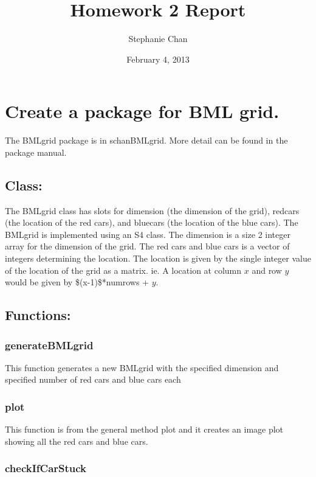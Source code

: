 \documentclass[11pt]{article}
\title{Homework 2 Report}
\author{Stephanie Chan}
\date{February 4, 2013}
\begin{document}
\maketitle

\setcounter{tocdepth}{3}
\tableofcontents
\vspace*{1cm}

\section{Create a package for BML grid.}
\label{sec-1}

  The BMLgrid package is in schanBMLgrid. More detail can be found in
  the package manual.
\subsection{Class:}
\label{sec-1-1}

   The BMLgrid class has slots for dimension (the dimension of the
   grid), redcars (the location of the red cars), and bluecars (the
   location of the blue cars).  The BMLgrid is implemented using an S4
   class.  The dimension is a size 2 integer array for the dimension
   of the grid.  The red cars and blue cars is a vector of integers
   determining the location.  The location is given by the single
   integer value of the location of the grid as a matrix.  ie. A
   location at column $x$ and row $y$ would be given by
   \$(x-1)\$*numrows + $y$.
\subsection{Functions:}
\label{sec-1-2}
\subsubsection{generateBMLgrid}
\label{sec-1-2-1}

    This function generates a new BMLgrid with the specified dimension
    and specified number of red cars and blue cars each
\subsubsection{plot}
\label{sec-1-2-2}

    This function is from the general method plot and it creates an
    image plot showing all the red cars and blue cars.
\subsubsection{checkIfCarStuck}
\label{sec-1-2-3}
\end{document}
